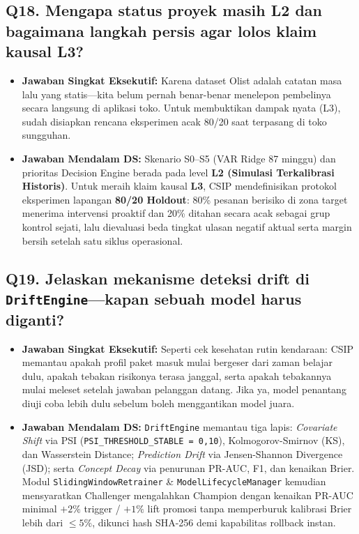 \documentclass[11pt,a4paper,oneside]{book}
\newcommand{\code}[1]{{\small\nolinkurl{#1}}}
\begin{document}
\subsection*{Q18. Mengapa status proyek masih L2 dan bagaimana langkah persis agar lolos klaim kausal L3?}
\begin{itemize}
  \item \textbf{Jawaban Singkat Eksekutif:} Karena dataset Olist adalah catatan masa lalu yang statis---kita belum pernah benar-benar menelepon pembelinya secara langsung di aplikasi toko. Untuk membuktikan dampak nyata (L3), sudah disiapkan rencana eksperimen acak 80/20 saat terpasang di toko sungguhan.
  \item \textbf{Jawaban Mendalam DS:} Skenario S0--S5 (VAR Ridge 87 minggu) dan prioritas Decision Engine berada pada level \textbf{L2 (Simulasi Terkalibrasi Historis)}. Untuk meraih klaim kausal \textbf{L3}, CSIP mendefinisikan protokol eksperimen lapangan \textbf{80/20 Holdout}: 80\% pesanan berisiko di zona target menerima intervensi proaktif dan 20\% ditahan secara acak sebagai grup kontrol sejati, lalu dievaluasi beda tingkat ulasan negatif aktual serta margin bersih setelah satu siklus operasional.
\end{itemize}

\subsection*{Q19. Jelaskan mekanisme deteksi drift di \texttt{DriftEngine}---kapan sebuah model harus diganti?}
\begin{itemize}
  \item \textbf{Jawaban Singkat Eksekutif:} Seperti cek kesehatan rutin kendaraan: CSIP memantau apakah profil paket masuk mulai bergeser dari zaman belajar dulu, apakah tebakan risikonya terasa janggal, serta apakah tebakannya mulai meleset setelah jawaban pelanggan datang. Jika ya, model penantang diuji coba lebih dulu sebelum boleh menggantikan model juara.
  \item \textbf{Jawaban Mendalam DS:} \code{DriftEngine} memantau tiga lapis: \emph{Covariate Shift} via PSI (\code{PSI_THRESHOLD_STABLE = 0,10}), Kolmogorov-Smirnov (KS), dan Wasserstein Distance; \emph{Prediction Drift} via Jensen-Shannon Divergence (JSD); serta \emph{Concept Decay} via penurunan PR-AUC, F1, dan kenaikan Brier. Modul \code{SlidingWindowRetrainer} \& \code{ModelLifecycleManager} kemudian mensyaratkan Challenger mengalahkan Champion dengan kenaikan PR-AUC minimal $+2\%$ trigger / $+1\%$ lift promosi tanpa memperburuk kalibrasi Brier lebih dari $\le 5\%$, dikunci hash SHA-256 demi kapabilitas rollback instan.
\end{itemize}
\end{document}
